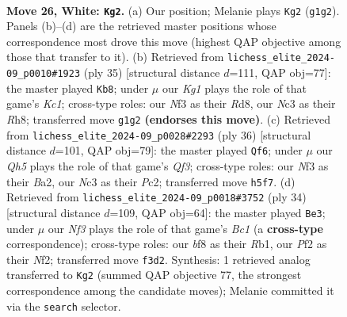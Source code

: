 \documentclass[11pt]{article}
\begin{document}
\begin{figure}[p]
\label{fig:thought-m48}
\end{figure}

\clearpage

\begin{figure}[p]\centering
\begin{subfigure}{0.46\textwidth}\centering
\resizebox{\linewidth}{!}{%
\newchessgame
\chessboard[
  setfen={2bq1b1k/rp1pr2p/p3pp2/2P4Q/P1nP2B1/2N2N1P/1P3P2/R1B2RK1 w - - 1 26},
  showmover=false,
  pgfstyle=straightmove, color=movearrow, markmove={g1-g2}
]}
\caption{}
\end{subfigure}\hfill
\begin{subfigure}{0.46\textwidth}\centering
\resizebox{\linewidth}{!}{%
\newchessgame
\chessboard[
  setfen={2kr1b1r/ppp3pp/4q1b1/2P1pp2/1P1n4/3PN2B/P4PPP/1RBQ1RK1 b - - 1 18},
  showmover=false,
  pgfstyle=straightmove, color=movearrow, markmove={c8-b8}
]}
\caption{}
\end{subfigure}
\\[4pt]
\begin{subfigure}{0.46\textwidth}\centering
\resizebox{\linewidth}{!}{%
\newchessgame
\chessboard[
  setfen={rb3rk1/1b1q1p1p/p3p1pP/1pp5/4P3/P1N1BQ2/BPP2PP1/2K4R w - - 0 19},
  showmover=false,
  pgfstyle=straightmove, color=movearrow, markmove={f3-f6}
]}
\caption{}
\end{subfigure}\hfill
\begin{subfigure}{0.46\textwidth}\centering
\resizebox{\linewidth}{!}{%
\newchessgame
\chessboard[
  setfen={1rb2rk1/p2pb1pp/1q2p3/2p1Pp2/2Pn1P2/P2B3Q/1P3NPP/1RB2RK1 w - - 9 18},
  showmover=false,
  pgfstyle=straightmove, color=movearrow, markmove={c1-e3}
]}
\caption{}
\end{subfigure}
\caption{\textbf{Move 26, White: \texttt{Kg2}.} (a) Our position; Melanie plays \texttt{Kg2} (\texttt{g1g2}). Panels (b)--(d) are the retrieved master positions whose correspondence most drove this move (highest QAP objective among those that transfer to it). (b) Retrieved from \texttt{lichess\_elite\_2024-09\_p0010\#1923} (ply 35) [structural distance $d$=111, QAP obj=77]: the master played \texttt{Kb8}; under $\mu$ our \emph{Kg1} plays the role of that game's \emph{Kc1}; cross-type roles: our \emph{N}f3 as their \emph{R}d8, our \emph{N}c3 as their \emph{R}h8; transferred move \texttt{g1g2} \textbf{(endorses this move)}. (c) Retrieved from \texttt{lichess\_elite\_2024-09\_p0028\#2293} (ply 36) [structural distance $d$=101, QAP obj=79]: the master played \texttt{Qf6}; under $\mu$ our \emph{Qh5} plays the role of that game's \emph{Qf3}; cross-type roles: our \emph{N}f3 as their \emph{B}a2, our \emph{N}c3 as their \emph{P}c2; transferred move \texttt{h5f7}. (d) Retrieved from \texttt{lichess\_elite\_2024-09\_p0018\#3752} (ply 34) [structural distance $d$=109, QAP obj=64]: the master played \texttt{Be3}; under $\mu$ our \emph{Nf3} plays the role of that game's \emph{Bc1} (a \textbf{cross-type} correspondence); cross-type roles: our \emph{b}f8 as their \emph{R}b1, our \emph{P}f2 as their \emph{N}f2; transferred move \texttt{f3d2}. Synthesis: 1 retrieved analog transferred to \texttt{Kg2} (summed QAP objective 77, the strongest correspondence among the candidate moves); Melanie committed it via the \texttt{search} selector.}

\end{figure}
\end{document}
